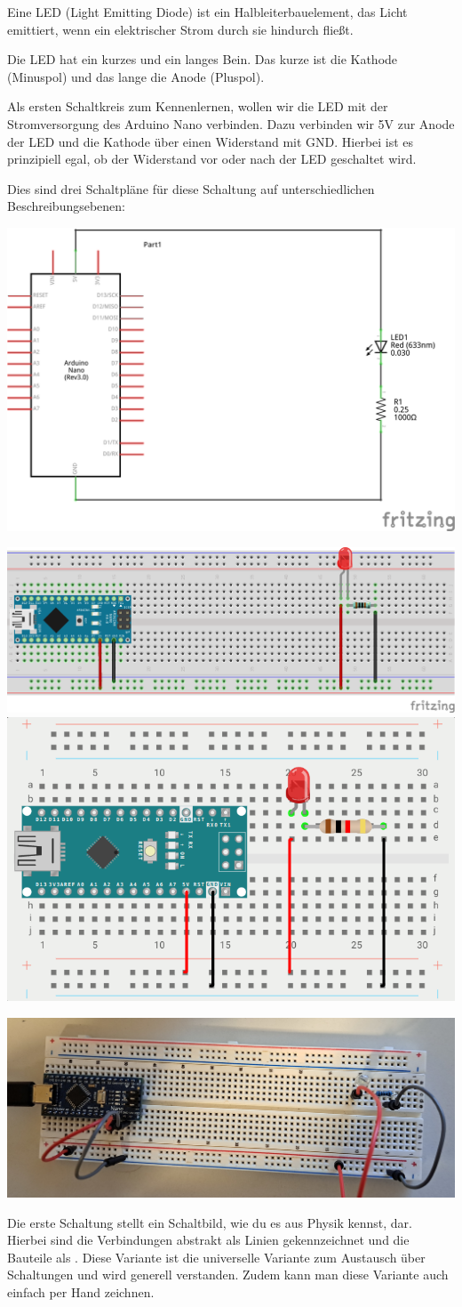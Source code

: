 \documentclass[a4paper,12pt]{book}
\begin{document}
Eine LED (Light Emitting Diode) ist ein Halbleiterbauelement, das Licht emittiert, wenn ein elektrischer Strom durch sie hindurch fließt.

Die LED hat ein kurzes und ein langes Bein.
Das kurze ist die Kathode (Minuspol) und das lange die Anode (Pluspol).

Als ersten Schaltkreis zum Kennenlernen, wollen wir die LED mit der Stromversorgung des Arduino Nano verbinden.
Dazu verbinden wir 5V zur Anode der LED und die Kathode über einen Widerstand mit GND.
Hierbei ist es prinzipiell egal, ob der Widerstand vor oder nach der LED geschaltet wird.

Dies sind drei Schaltpläne für diese Schaltung auf unterschiedlichen Beschreibungsebenen:

\begin{center}
  \includegraphics[width=.49\textwidth]{schaltung/led/circuit.png}

  \includegraphics[width=.49\textwidth]{schaltung/led/scheme.png}
  \includegraphics[width=.49\textwidth]{schaltung/led/scheme2.png}

  \includegraphics[width=.70\textwidth]{schaltung/led/foto.jpg}%
\end{center}
Die erste Schaltung stellt ein Schaltbild, wie du es aus Physik kennst, dar.
Hierbei sind die Verbindungen abstrakt als Linien gekennzeichnet und die Bauteile als 
.
Diese Variante ist die universelle Variante zum Austausch über Schaltungen und wird generell verstanden.
Zudem kann man diese Variante auch einfach per Hand zeichnen.
\end{document}
